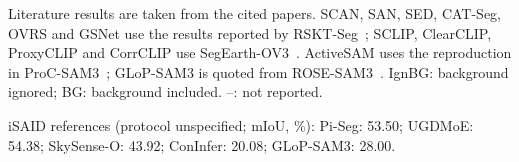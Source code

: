 \begin{table}[!tbp]
\begin{minipage}{\linewidth}
\footnotesize Literature results are taken from the cited papers. SCAN, SAN, SED, CAT-Seg, OVRS and GSNet use the results reported by RSKT-Seg~\cite{liExploringEfficientOpenVocabulary2026}; SCLIP, ClearCLIP, ProxyCLIP and CorrCLIP use SegEarth-OV3~\cite{liSegEarthOV3ExploringSAM2026}. ActiveSAM uses the reproduction in ProC-SAM3~\cite{songPromptCalibratedSAM32026}; GLoP-SAM3 is quoted from ROSE-SAM3~\cite{songROSESAM3ResponseOrientedPrompt2026}. IgnBG: background ignored; BG: background included. --: not reported.\par iSAID references (protocol unspecified; mIoU, \%): Pi-Seg: 53.50; UGDMoE: 54.38; SkySense-O: 43.92; ConInfer: 20.08; GLoP-SAM3: 28.00.
\end{minipage}
\end{table}
